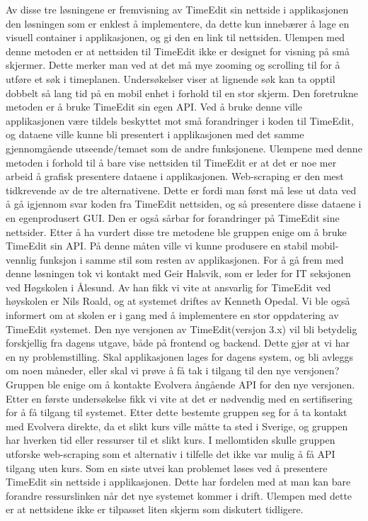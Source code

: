 \documentclass[../main.tex]{subfiles}
\begin{document}
Av disse tre løsningene er fremvisning av TimeEdit sin nettside i applikasjonen den løsningen som er enklest å implementere, da dette kun innebærer å lage en visuell container i applikasjonen, og gi den en link til nettsiden. Ulempen med denne metoden er at nettsiden til TimeEdit ikke er designet for visning på små skjermer. Dette merker man ved at det må mye zooming og scrolling til for å utføre et søk i timeplanen. Undersøkelser viser at lignende søk kan ta opptil dobbelt så lang tid på en mobil enhet i forhold til en stor skjerm.
Den foretrukne metoden er å bruke TimeEdit sin egen API. Ved å bruke denne ville applikasjonen være tildels beskyttet mot små forandringer i koden til TimeEdit, og dataene ville kunne bli presentert i applikasjonen med det samme gjennomgående utseende/temaet som de andre funksjonene. Ulempene med denne metoden i forhold til å bare vise nettsiden til TimeEdit er at det er noe mer arbeid å grafisk presentere dataene i applikasjonen.
Web-scraping er den mest tidkrevende av de tre alternativene. Dette er fordi man først må lese ut data ved å gå igjennom svar koden fra TimeEdit nettsiden, og så presentere disse dataene i en egenprodusert GUI. Den er også sårbar for forandringer på TimeEdit sine nettsider.\newline
\newline
Etter å ha vurdert disse tre metodene ble gruppen enige om å bruke TimeEdit sin API. På denne måten ville vi kunne produsere en stabil mobil-vennlig funksjon i samme stil som resten av applikasjonen.\newline
\newline
For å gå frem med denne løsningen tok vi kontakt med Geir Halsvik, som er leder for IT seksjonen ved Høgskolen i Ålesund. Av han fikk vi vite at ansvarlig for TimeEdit ved høyskolen er Nils Roald, og at systemet driftes av Kenneth Opedal. Vi ble også informert om at skolen er i gang med å implementere en stor oppdatering av TimeEdit systemet. Den nye versjonen av TimeEdit(versjon 3.x) vil bli betydelig forskjellig fra dagens utgave, både på frontend og backend.\newline
\newline
Dette gjør at vi har en ny problemstilling. Skal applikasjonen lages for dagens system, og bli avleggs om noen måneder, eller skal vi prøve å få tak i tilgang til den nye versjonen? Gruppen ble enige om å kontakte Evolvera ångående API for den nye versjonen. Etter en første undersøkelse fikk vi vite at det er nødvendig med en sertifisering for å få tilgang til systemet. Etter dette bestemte gruppen seg for å ta kontakt med Evolvera direkte, da et slikt kurs ville måtte ta sted i Sverige, og gruppen har hverken tid eller ressurser til et slikt kurs. I mellomtiden skulle gruppen utforske web-scraping som et alternativ i tilfelle det ikke var mulig å få API tilgang uten kurs. Som en siste utvei kan problemet løses ved å presentere TimeEdit sin nettside i applikasjonen. Dette har fordelen med at man kan bare forandre ressurslinken når det nye systemet kommer i drift. Ulempen med dette er at nettsidene ikke er tilpasset liten skjerm som diskutert tidligere.\newline
\end{document}
